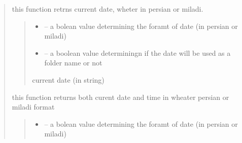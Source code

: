 \documentclass[letterpaper,10pt,english]{sphinxmanual}
\begin{document}
\begin{quote}
\begin{savenotes}\begin{fulllineitems}
\label{\detokenize{setting/backend/date_funcs:oxin.backend.date_funcs.get_date}}
\pysigstartsignatures
{}
\pysigstopsignatures
\sphinxAtStartPar
this function retrns current date, wheter in persian or miladi.
\begin{quote}\begin{description}
\begin{itemize}
\item {} 
\sphinxAtStartPar
{} – a bolean value determining the foramt of date (in persian or miladi)

\item {} 
\sphinxAtStartPar
{} – a boolean value determiningn if the date will be used as a folder name or not

\end{itemize}

\sphinxAtStartPar
current date (in string)

\end{description}\end{quote}

\end{fulllineitems}\end{savenotes}


\begin{savenotes}\begin{fulllineitems}
\label{\detokenize{setting/backend/date_funcs:oxin.backend.date_funcs.get_datetime}}
\pysigstartsignatures
{}
\pysigstopsignatures
\sphinxAtStartPar
this function returns both curent date and time in wheater persian or miladi format
\begin{quote}\begin{description}
\begin{itemize}
\item {} 
\sphinxAtStartPar
{} – a bolean value determining the foramt of date (in persian or miladi)


\end{itemize}
\end{description}
\end{quote}
\end{fulllineitems}
\end{savenotes}
\end{quote}
\end{document}
